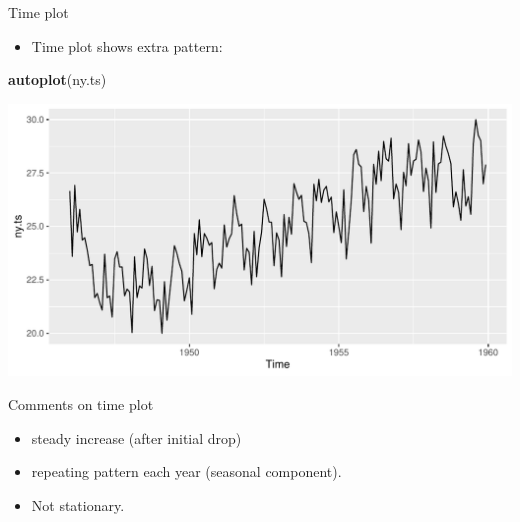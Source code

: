 \documentclass[ignorenonframetext,]{beamer}
\newenvironment{Shaded}{\begin{snugshade}}{\end{snugshade}}
\newcommand{\KeywordTok}[1]{\textcolor[rgb]{0.13,0.29,0.53}{\textbf{#1}}}
\newcommand{\NormalTok}[1]{#1}
\providecommand{\tightlist}{%
  \setlength{\itemsep}{0pt}\setlength{\parskip}{0pt}}
\begin{document}
\begin{frame}[fragile]{Time plot}
\protect\hypertarget{time-plot}{}

\begin{itemize}
\tightlist
\item
  Time plot shows extra pattern:
\end{itemize}

\begin{Shaded}
\begin{Highlighting}[]
\KeywordTok{autoplot}\NormalTok{(ny.ts)}
\end{Highlighting}
\end{Shaded}

\includegraphics{figure/unnamed-chunk-573-1.pdf}

\end{frame}

\begin{frame}{Comments on time plot}
\protect\hypertarget{comments-on-time-plot}{}

\begin{itemize}
\tightlist
\item
  steady increase (after initial drop)
\item
  repeating pattern each year (seasonal component).
\item
  Not stationary.
\end{itemize}

\end{frame}
\end{document}
